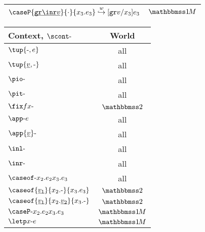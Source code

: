 \begin{figure}[t]
\begin{abstrsyn}
\begin{tabular}{| l c l | c |}
\multicolumn{3}{|l|}{$\caseP {\exv{\pure{\inr v}}}{\cdot}{x_3.e_3} \stepsym w [\pure v/x_3]e_3$}			& $\bbonem$ \\
\hline
\end{tabular}
\begin{tabular}{|l|c|} \hline
Context, $\scont \dash$ & World \\ \hline 
$\tup {\dash ,e}$ 										& all \\
$\tup {\exv v,\dash }$ 									& all \\
$\pio \dash$ 											& all \\
$\pit \dash $ 											& all \\
$\fix fx \dash$ 										& $\bbtwo$ \\
$\app \dash e$ 											& all \\
$\app {\exv v} \dash $ 									& all \\
$\inl \dash $ 											& all \\
$\inr \dash $ 											& all \\
$\caseof \dash {x_2.e_2}{x_3.e_3}$ 						& all \\
$\caseof {\exv {v_1}}{x_2.\dash}{x_3.e_3}$				& $\bbtwo$ \\
$\caseof {\exv {v_1}}{x_2.\exv {v_2}}{x_3.\dash}$		& $\bbtwo$ \\
$\caseP \dash {x_2.e_2}{x_3.e_3}$ 						& $\bbonem$ \\
$\letp x \dash e$ 										& $\bbonem$ \\
\hline
\end{tabular}


\end{abstrsyn}
\end{figure}
